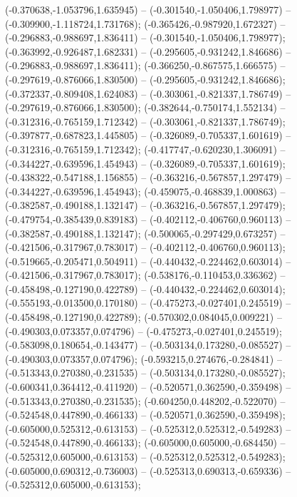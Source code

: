  (-0.370638,-1.053796,1.635945) -- (-0.301540,-1.050406,1.798977) -- (-0.309900,-1.118724,1.731768);
 (-0.365426,-0.987920,1.672327) -- (-0.296883,-0.988697,1.836411) -- (-0.301540,-1.050406,1.798977);
 (-0.363992,-0.926487,1.682331) -- (-0.295605,-0.931242,1.846686) -- (-0.296883,-0.988697,1.836411);
 (-0.366250,-0.867575,1.666575) -- (-0.297619,-0.876066,1.830500) -- (-0.295605,-0.931242,1.846686);
 (-0.372337,-0.809408,1.624083) -- (-0.303061,-0.821337,1.786749) -- (-0.297619,-0.876066,1.830500);
 (-0.382644,-0.750174,1.552134) -- (-0.312316,-0.765159,1.712342) -- (-0.303061,-0.821337,1.786749);
 (-0.397877,-0.687823,1.445805) -- (-0.326089,-0.705337,1.601619) -- (-0.312316,-0.765159,1.712342);
 (-0.417747,-0.620230,1.306091) -- (-0.344227,-0.639596,1.454943) -- (-0.326089,-0.705337,1.601619);
 (-0.438322,-0.547188,1.156855) -- (-0.363216,-0.567857,1.297479) -- (-0.344227,-0.639596,1.454943);
 (-0.459075,-0.468839,1.000863) -- (-0.382587,-0.490188,1.132147) -- (-0.363216,-0.567857,1.297479);
 (-0.479754,-0.385439,0.839183) -- (-0.402112,-0.406760,0.960113) -- (-0.382587,-0.490188,1.132147);
 (-0.500065,-0.297429,0.673257) -- (-0.421506,-0.317967,0.783017) -- (-0.402112,-0.406760,0.960113);
 (-0.519665,-0.205471,0.504911) -- (-0.440432,-0.224462,0.603014) -- (-0.421506,-0.317967,0.783017);
 (-0.538176,-0.110453,0.336362) -- (-0.458498,-0.127190,0.422789) -- (-0.440432,-0.224462,0.603014);
 (-0.555193,-0.013500,0.170180) -- (-0.475273,-0.027401,0.245519) -- (-0.458498,-0.127190,0.422789);
 (-0.570302,0.084045,0.009221) -- (-0.490303,0.073357,0.074796) -- (-0.475273,-0.027401,0.245519);
 (-0.583098,0.180654,-0.143477) -- (-0.503134,0.173280,-0.085527) -- (-0.490303,0.073357,0.074796);
 (-0.593215,0.274676,-0.284841) -- (-0.513343,0.270380,-0.231535) -- (-0.503134,0.173280,-0.085527);
 (-0.600341,0.364412,-0.411920) -- (-0.520571,0.362590,-0.359498) -- (-0.513343,0.270380,-0.231535);
 (-0.604250,0.448202,-0.522070) -- (-0.524548,0.447890,-0.466133) -- (-0.520571,0.362590,-0.359498);
 (-0.605000,0.525312,-0.613153) -- (-0.525312,0.525312,-0.549283) -- (-0.524548,0.447890,-0.466133);
 (-0.605000,0.605000,-0.684450) -- (-0.525312,0.605000,-0.613153) -- (-0.525312,0.525312,-0.549283);
 (-0.605000,0.690312,-0.736003) -- (-0.525313,0.690313,-0.659336) -- (-0.525312,0.605000,-0.613153);
